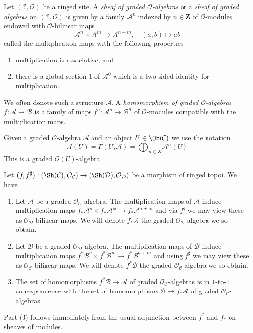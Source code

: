 \begin{definition}
\label{definition-ga}
Let $(\mathcal{C}, \mathcal{O})$ be a ringed site. A
{\it sheaf of graded $\mathcal{O}$-algebras}
or a {\it sheaf of graded algebras} on $(\mathcal{C}, \mathcal{O})$
is given by a family $\mathcal{A}^n$ indexed by $n \in \mathbf{Z}$
of $\mathcal{O}$-modules endowed with $\mathcal{O}$-bilinear maps
$$
\mathcal{A}^n \times \mathcal{A}^m \to \mathcal{A}^{n + m},\quad
(a, b) \longmapsto ab
$$
called the multiplication maps with the following properties
\begin{enumerate}
\item multiplication is associative, and
\item there is a global section $1$ of $\mathcal{A}^0$
which is a two-sided identity for multiplication.
\end{enumerate}
We often denote such a structure $\mathcal{A}$.
A {\it homomorphism of graded $\mathcal{O}$-algebras}
$f : \mathcal{A} \to \mathcal{B}$ is a family of maps
$f^n : \mathcal{A}^n \to \mathcal{B}^n$
of $\mathcal{O}$-modules compatible with the multiplication maps.
\end{definition}

\noindent
Given a graded $\mathcal{O}$-algebra $\mathcal{A}$
and an object $U \in \Ob(\mathcal{C})$ we use the notation
$$
\mathcal{A}(U) =
\Gamma(U, \mathcal{A}) =
\bigoplus\nolimits_{n \in \mathbf{Z}} \mathcal{A}^n(U)
$$
This is a graded $\mathcal{O}(U)$-algebra.

\begin{remark}
\label{remark-functoriality-ga}
Let $(f, f^\sharp) : (\Sh(\mathcal{C}), \mathcal{O}_\mathcal{C})
\to (\Sh(\mathcal{D}), \mathcal{O}_\mathcal{D})$
be a morphism of ringed topoi. We have
\begin{enumerate}
\item Let $\mathcal{A}$ be a graded $\mathcal{O}_\mathcal{C}$-algebra.
The multiplication maps of $\mathcal{A}$ induce multiplication maps
$f_*\mathcal{A}^n \times f_*\mathcal{A}^m \to f_*\mathcal{A}^{n + m}$
and via $f^\sharp$ we may view these as $\mathcal{O}_\mathcal{D}$-bilinear
maps. We will denote $f_*\mathcal{A}$ the graded
$\mathcal{O}_\mathcal{D}$-algebra we so obtain.
\item Let $\mathcal{B}$ be a graded
$\mathcal{O}_\mathcal{D}$-algebra. 
The multiplication maps of $\mathcal{B}$ induce multiplication maps
$f^*\mathcal{B}^n \times f^*\mathcal{B}^m \to f^*\mathcal{B}^{n + m}$
and using $f^\sharp$ we may view these as $\mathcal{O}_\mathcal{C}$-bilinear
maps. We will denote $f^*\mathcal{B}$
the graded $\mathcal{O}_\mathcal{C}$-algebra we so obtain.
\item The set of homomorphisms $f^*\mathcal{B} \to \mathcal{A}$
of graded $\mathcal{O}_\mathcal{C}$-algebras is in
$1$-to-$1$ correspondence with the set of homomorphisms
$\mathcal{B} \to f_*\mathcal{A}$ of graded $\mathcal{O}_\mathcal{C}$-algebras.
\end{enumerate}
Part (3) follows immediately from the usual adjunction between $f^*$ and $f_*$
on sheaves of modules.
\end{remark}




